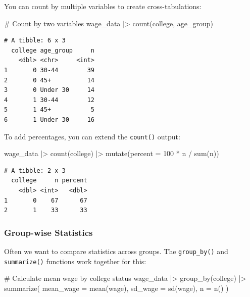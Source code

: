 \documentclass[
  letterpaper,
  DIV=11,
  numbers=noendperiod]{scrreprt}
\newenvironment{Shaded}{\begin{snugshade}}{\end{snugshade}}
\newcommand{\AttributeTok}[1]{\textcolor[rgb]{0.40,0.45,0.13}{#1}}
\newcommand{\CommentTok}[1]{\textcolor[rgb]{0.37,0.37,0.37}{#1}}
\newcommand{\DecValTok}[1]{\textcolor[rgb]{0.68,0.00,0.00}{#1}}
\newcommand{\FunctionTok}[1]{\textcolor[rgb]{0.28,0.35,0.67}{#1}}
\newcommand{\NormalTok}[1]{\textcolor[rgb]{0.00,0.23,0.31}{#1}}
\newcommand{\SpecialCharTok}[1]{\textcolor[rgb]{0.37,0.37,0.37}{#1}}
\begin{document}
You can count by multiple variables to create cross-tabulations:

\begin{Shaded}
\begin{Highlighting}[]
\CommentTok{\# Count by two variables}
\NormalTok{wage\_data }\SpecialCharTok{|\textgreater{}}
  \FunctionTok{count}\NormalTok{(college, age\_group)}
\end{Highlighting}
\end{Shaded}

\begin{verbatim}
# A tibble: 6 x 3
  college age_group     n
    <dbl> <chr>     <int>
1       0 30-44        39
2       0 45+          14
3       0 Under 30     14
4       1 30-44        12
5       1 45+           5
6       1 Under 30     16
\end{verbatim}

To add percentages, you can extend the \texttt{count()} output:

\begin{Shaded}
\begin{Highlighting}[]
\NormalTok{wage\_data }\SpecialCharTok{|\textgreater{}}
  \FunctionTok{count}\NormalTok{(college) }\SpecialCharTok{|\textgreater{}}
  \FunctionTok{mutate}\NormalTok{(}\AttributeTok{percent =} \DecValTok{100} \SpecialCharTok{*}\NormalTok{ n }\SpecialCharTok{/} \FunctionTok{sum}\NormalTok{(n))}
\end{Highlighting}
\end{Shaded}

\begin{verbatim}
# A tibble: 2 x 3
  college     n percent
    <dbl> <int>   <dbl>
1       0    67      67
2       1    33      33
\end{verbatim}

\subsubsection{Group-wise Statistics}\label{group-wise-statistics}

Often we want to compare statistics across groups. The
\texttt{group\_by()} and \texttt{summarize()} functions work together
for this:

\begin{Shaded}
\begin{Highlighting}[]
\CommentTok{\# Calculate mean wage by college status}
\NormalTok{wage\_data }\SpecialCharTok{|\textgreater{}}
  \FunctionTok{group\_by}\NormalTok{(college) }\SpecialCharTok{|\textgreater{}}
  \FunctionTok{summarize}\NormalTok{(}
    \AttributeTok{mean\_wage =} \FunctionTok{mean}\NormalTok{(wage),}
    \AttributeTok{sd\_wage =} \FunctionTok{sd}\NormalTok{(wage),}
    \AttributeTok{n =} \FunctionTok{n}\NormalTok{()}
\NormalTok{  )}
\end{Highlighting}
\end{Shaded}
\end{document}
